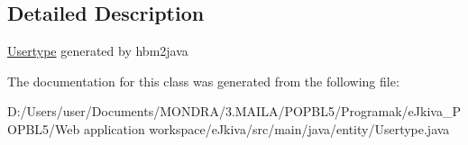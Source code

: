 \subsection{Detailed Description}
\mbox{\hyperlink{classentity_1_1_usertype}{Usertype}} generated by hbm2java 

The documentation for this class was generated from the following file\+:\begin{DoxyCompactItemize}
\item 
D\+:/\+Users/user/\+Documents/\+M\+O\+N\+D\+R\+A/3.\+M\+A\+I\+L\+A/\+P\+O\+P\+B\+L5/\+Programak/e\+Jkiva\+\_\+\+P\+O\+P\+B\+L5/\+Web application workspace/e\+Jkiva/src/main/java/entity/Usertype.\+java\end{DoxyCompactItemize}
